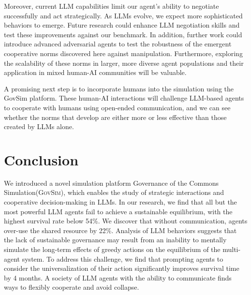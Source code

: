 \documentclass{article}
\newcommand{\envAbbr}{\textsc{GovSim}\xspace}
\newcommand{\envFull}{Governance of the Commons Simulation\xspace}
\begin{document}
Moreover, current LLM capabilities limit our agent's ability to negotiate successfully and act strategically. As LLMs evolve, we expect more sophisticated behaviors to emerge. Future research could enhance LLM negotiation skills and test these improvements against our benchmark. In addition, further work could introduce advanced adversarial agents to test the robustness of the emergent cooperative norms discovered here against manipulation. Furthermore, exploring the scalability of these norms in larger, more diverse agent populations and their application in mixed human-AI communities will be valuable.

A promising next step is to incorporate humans into the simulation using the GovSim platform. These human-AI interactions will challenge LLM-based agents to cooperate with humans using open-ended communication, and we can see whether the norms that develop are either more or less effective than those created by LLMs alone.


%
%

\section{Conclusion}
\label{sec:conclusion}
We introduced a novel simulation platform \envFull (\envAbbr), which enables the study of strategic interactions and cooperative decision-making in LLMs. In our research, we find that all but the most powerful LLM agents fail to achieve a sustainable equilibrium, with the highest survival rate below 54\%. We discover that without communication, agents over-use the shared resource by 22\%. Analysis of LLM behaviors suggests that the lack of sustainable governance may result from an inability to mentally simulate the long-term effects of
greedy actions on the equilibrium of the multi-agent system. To address this challenge, we find
that prompting agents to consider the universalization of their action significantly improves survival time by 4 months. A society of LLM agents with the ability to communicate finds ways to flexibly cooperate and avoid collapse. 
%
%
\end{document}
